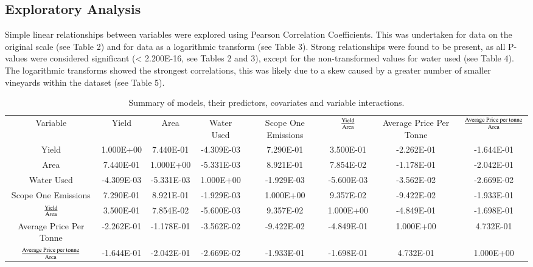 \documentclass[review,12pt,authoryear]{elsarticle}
\begin{document}
\begin{linenumbers}
\subsection{Exploratory Analysis}
Simple linear relationships between variables were explored using Pearson Correlation Coefficients. This was undertaken for data on the original scale (see Table 2) and for data as a logarithmic transform (see Table 3). Strong relationships were found to be present, as all P-values were considered significant (< 2.200E-16, see Tables 2 and 3), except for the non-transformed values for water used (see Table 4). The logarithmic transforms showed the strongest correlations, this was likely due to a skew caused by a greater number of smaller vineyards within the dataset (see Table 5).

\begin{table}[]
  \caption{Summary of models, their predictors, covariates and variable interactions.}
  \label{tab:tab2}
  \begin{tabular}{cccccccc}
  Variable                             & Yield      & Area       & Water Used & Scope One Emissions & $\textrm{Yield}\over\textrm{Area}$ & Average Price Per Tonne & ${\textrm{Average Price per tonne}\over\textrm{Area}}$ \\
  Yield                                & 1.000E+00  & 7.440E-01  & -4.309E-03 & 7.290E-01           & 3.500E-01            & -2.262E-01              & -1.644E-01                           \\
  Area                                 & 7.440E-01  & 1.000E+00  & -5.331E-03 & 8.921E-01           & 7.854E-02            & -1.178E-01              & -2.042E-01                           \\
  Water Used                           & -4.309E-03 & -5.331E-03 & 1.000E+00  & -1.929E-03          & -5.600E-03           & -3.562E-02              & -2.669E-02                           \\
  Scope One Emissions                  & 7.290E-01  & 8.921E-01  & -1.929E-03 & 1.000E+00           & 9.357E-02            & -9.422E-02              & -1.933E-01                           \\
  $\textrm{Yield}\over\textrm{Area}$                 & 3.500E-01  & 7.854E-02  & -5.600E-03 & 9.357E-02           & 1.000E+00            & -4.849E-01              & -1.698E-01                           \\
  Average Price Per Tonne              & -2.262E-01 & -1.178E-01 & -3.562E-02 & -9.422E-02          & -4.849E-01           & 1.000E+00               & 4.732E-01                            \\
  ${\textrm{Average Price per tonne}\over\textrm{Area}}$ & -1.644E-01 & -2.042E-01 & -2.669E-02 & -1.933E-01          & -1.698E-01           & 4.732E-01               & 1.000E+00                           
  \end{tabular}
  \end{table}


\end{linenumbers}
\end{document}
